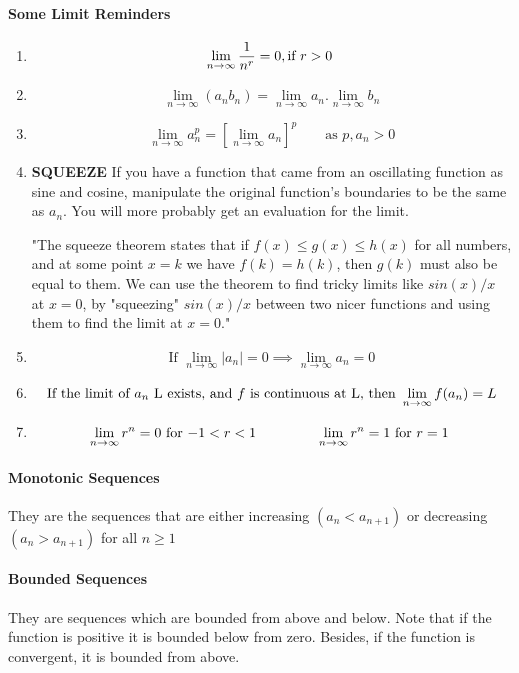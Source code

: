 \documentclass{article}
\begin{document}
\paragraph{Some Limit Reminders}
\begin{enumerate}[1.]
\item $$\lim_{n \to \infty} \frac{1}{n^r}=0, \text{if $ r>0 $	}$$ 
\item $$ \lim_{n \to \infty} (a_nb_n) = \lim_{n \to \infty} a_n . \lim_{n \to \infty} b_n$$
\item $$ \lim_{n \to \infty} a_n^p = \left[ \lim_{n \to \infty} a_n	 \right]^p \qquad \text{as $p, a_n>0$} $$
\item \textbf{SQUEEZE} If you have a function that came from an oscillating function as sine and cosine, manipulate the original function's boundaries to be the same as $ a_n $. You will more probably get an evaluation for the limit.

	"The squeeze theorem states that if $f(x) \leq g(x) \leq h(x)$ for all numbers, and at some point $x=k$ we have $f(k)=h(k)$, then $g(k)$ must also be equal to them. We can use the theorem to find tricky limits like $sin(x)/x$ at $x=0$, by "squeezing" $sin(x)/x$ between two nicer functions and using them to find the limit at $x=0$."


\item $$ \text{If } \lim_{n \to \infty} |a_n| = 0 \implies \lim_{n \to \infty} a_n=0 $$


\item $$ \text{If the limit of $a_n$ L exists, and $ f $ is continuous at L, then }
	\lim_{n \to \infty} f(a_n) = L $$


\item \[
		\lim_{n \to \infty} r^n = 0 \text{ for $ -1<r<1 $  } \qquad \qquad 
		\lim_{n \to \infty} r^n	= 1 \text{ for $ r = 1 $  }
	\]

\end{enumerate}

\paragraph{Monotonic Sequences}
They are the sequences that are either increasing $ (a_n<a_{n+1}) $ or decreasing $ (a_n>a_{n+1}) $ for all $ n \geq 1 $ 

\paragraph{Bounded Sequences}
They are sequences which are bounded from above and below. Note that if the function is positive it is bounded below from zero. Besides, if the function is convergent, it is bounded from above. 
\end{document}
